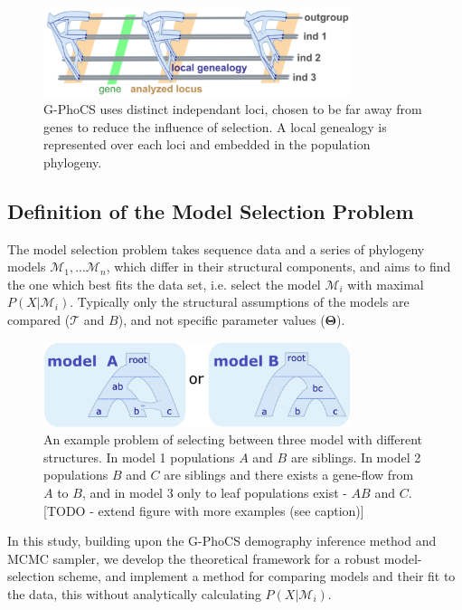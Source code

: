 \documentclass[11pt]{article}
\newcommand{\vect}[1]{\boldsymbol{\mathbf{#1}}}
\newcommand{\M}{\mathcal{M}}
\newcommand{\Tr}{\mathcal{T}}
\newcommand{\T}{\vect{\Theta}}
\newcommand{\1}{\mathbbm{1}}
\newcommand{\gp}{G-PhoCS }
\begin{document}
% 

\begin{figure}[h]
\centering
\includegraphics[width=0.8\textwidth]
{multiple_loci_across_sequence}
\captionsetup{width=.8\textwidth}
\caption{\gp uses distinct independant loci, chosen to be far away from genes to reduce the influence of selection. A local genealogy is represented over each loci and embedded in the population phylogeny.}
\label{fig:multiple_loci_across_sequence}
\end{figure}


\subsection{Definition of the Model Selection Problem}

The model selection problem takes sequence data and a series of phylogeny models $\M_1,... \M_n$, which differ in their structural components, and aims to find the one which best fits the data set, i.e. select the model $\M_i$ with maximal $P(X|\M_i)$. Typically only the structural assumptions of the models are compared ($\Tr$ and $B$), and not specific parameter values ($\T$).


\begin{figure}[h]
\centering
\includegraphics[width=0.8\textwidth]
{model_A__OR__model_b}
\captionsetup{width=.8\textwidth}
\caption{An example problem of selecting between three model with different structures. In model 1 populations $A$ and $B$ are siblings. In model 2 populations $B$ and $C$ are siblings and there exists a gene-flow from $A$ to $B$, and in model 3 only to leaf populations exist - $AB$ and $C$. [TODO - extend figure with more examples (see caption)]}
\label{fig:model_A__OR__model_b}
\end{figure}


%
In this study, building upon the \gp demography inference method and MCMC sampler, we develop the theoretical framework for a robust model-selection scheme, and implement a method for comparing models and their fit to the data, this without analytically calculating $P(X|\M_i)$.
%
\end{document}
